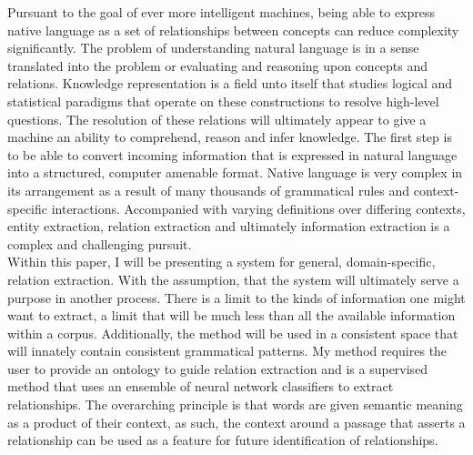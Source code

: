 \documentclass[12pt]{article} %
\begin{document}
Pursuant to the goal of ever more intelligent machines, being able to express native language as a set of relationships between concepts can reduce complexity significantly. The problem of understanding natural language is in a sense translated into the problem or evaluating and reasoning upon concepts and relations. Knowledge representation is a field unto itself that studies logical and statistical paradigms that operate on these constructions to resolve high-level questions. The resolution of these relations will ultimately appear to give a machine an ability to comprehend, reason and infer knowledge. The first step is to be able to convert incoming information that is expressed in natural language into a structured, computer amenable format. Native language is very complex in its arrangement as a result of many thousands of grammatical rules and context-specific interactions. Accompanied with varying definitions over differing contexts, entity extraction, relation extraction and ultimately information extraction is a complex and challenging pursuit.\\

Within this paper, I will be presenting a system for general, domain-specific, relation extraction. With the assumption, that the system will ultimately serve a purpose in another process. There is a limit to the kinds of information one might want to extract, a limit that will be much less than all the available information within a corpus. Additionally, the method will be used in a consistent space that will innately contain consistent grammatical patterns. My method requires the user to provide an ontology to guide relation extraction and is a supervised method that uses an ensemble of neural network classifiers to extract relationships. The overarching principle is that words are given semantic meaning as a product of their context, as such, the context around a passage that asserts a relationship can be used as a feature for future identification of relationships.\\
\end{document}
